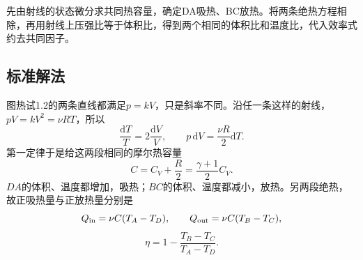 \documentclass[UTF8,fontset=fandol,a4paper,11pt]{ctexart}
\begin{document}
先由射线的状态微分求共同热容量，确定DA吸热、BC放热。将两条绝热方程相除，再用射线上压强比等于体积比，得到两个相同的体积比和温度比，代入效率式约去共同因子。



\subsection*{标准解法}


图热试1.2的两条直线都满足$p=kV$，只是斜率不同。沿任一条这样的射线，$pV=kV^2=\nu RT$，所以
\[
\frac{\mathrm dT}{T}=2\frac{\mathrm dV}{V},\qquad
p\,\mathrm dV=\frac{\nu R}{2}\mathrm dT.
\]
第一定律于是给这两段相同的摩尔热容量
\[
\boxed{C=C_V+\frac R2=\frac{\gamma+1}{2}C_V}.
\]
$DA$的体积、温度都增加，吸热；$BC$的体积、温度都减小，放热。另两段绝热，故正吸热量与正放热量分别是
\[
Q_{\rm in}=\nu C(T_A-T_D),\qquad
Q_{\rm out}=\nu C(T_B-T_C),
\]
\[
\eta=1-\frac{T_B-T_C}{T_A-T_D}.
\]
\end{document}
